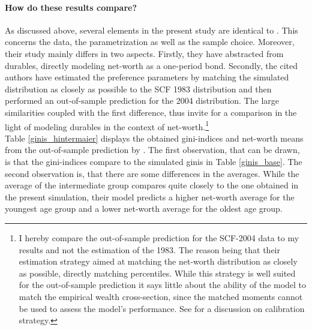 \documentclass[a4paper,12pt,legno]{article}
\begin{document}
\paragraph{How do these results compare?} As discussed above, several elements in the present study are identical to \cite{hintermaier2011}. This concerns the data, the parametrization as well as the sample choice. Moreover, their study mainly differs in two aspects. Firstly, they have abstracted from durables, directly modeling net-worth as a one-period bond. Secondly, the cited authors have estimated the preference parameters by matching the simulated distribution as closely as possible to the SCF 1983 distribution and then performed an out-of-sample prediction for the 2004 distribution. The large similarities coupled with the first difference, thus invite for a comparison in the light of modeling durables in the context of net-worth.\footnote{I hereby compare the out-of-sample prediction for the SCF-2004 data to my results and not the estimation of the 1983. The reason being that their estimation strategy aimed at matching the net-worth distribution as closely as possible, directly matching percentiles. While this strategy is well suited for the out-of-sample prediction it says little about the ability of the model to match the empirical wealth cross-section, since the matched moments cannot be used to assess the model's performance. See \cite{kydland1996computational} for a discussion on calibration strategy.} \\ Table \ref{ginis_hintermaier}
displays the obtained gini-indices and net-worth means from the out-of-sample prediction by \cite{hintermaier2011}. The first observation, that can be drawn, is that the gini-indices compare to the simulated ginis in Table \ref{ginis_base}. The second observation is, that there are some differences in the averages. While the average of the intermediate group compares quite closely to the one obtained in the present simulation, their model predicts a higher net-worth average for the youngest age group and a lower net-worth average for the oldest age group.\\ 
\end{document}
